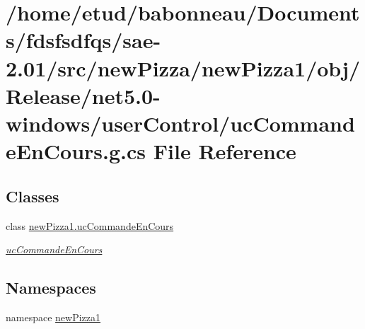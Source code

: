 \hypertarget{Release_2net5_80-windows_2userControl_2ucCommandeEnCours_8g_8cs}{}\section{/home/etud/babonneau/\+Documents/fdsfsdfqs/sae-\/2.01/src/new\+Pizza/new\+Pizza1/obj/\+Release/net5.0-\/windows/user\+Control/uc\+Commande\+En\+Cours.g.\+cs File Reference}
\label{Release_2net5_80-windows_2userControl_2ucCommandeEnCours_8g_8cs}
\subsection*{Classes}
\begin{DoxyCompactItemize}
\item 
class \hyperlink{classnewPizza1_1_1ucCommandeEnCours}{new\+Pizza1.\+uc\+Commande\+En\+Cours}
\begin{DoxyCompactList}\small\item\em \hyperlink{classnewPizza1_1_1ucCommandeEnCours}{uc\+Commande\+En\+Cours} \end{DoxyCompactList}\end{DoxyCompactItemize}
\subsection*{Namespaces}
\begin{DoxyCompactItemize}
\item 
namespace \hyperlink{namespacenewPizza1}{new\+Pizza1}
\end{DoxyCompactItemize}
